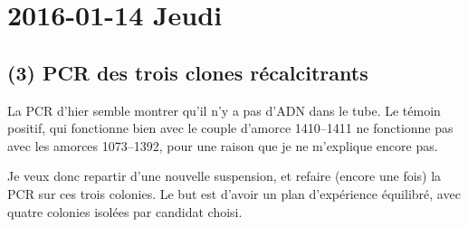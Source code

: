 \documentclass[9pt, oneside, twocolumn]{scrartcl}
\begin{document}
\section{2016-01-14 Jeudi}
\label{sec:orgheadline38}
\subsection{(3) PCR des trois clones récalcitrants}
\label{sec:orgheadline34}
La PCR d'hier semble montrer qu'il n'y a pas d'ADN dans le tube. Le témoin
positif, qui fonctionne bien avec le couple d'amorce 1410--1411 ne fonctionne
pas avec les amorces 1073--1392, pour une raison que je ne m'explique encore
pas. 

Je veux donc repartir d'une nouvelle suspension, et refaire (encore une fois) la
PCR sur ces trois colonies. Le but est d'avoir un plan d'expérience équilibré,
avec quatre colonies isolées par candidat choisi.
\end{document}
